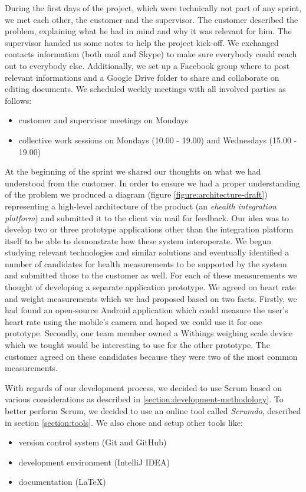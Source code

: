 During the first days of the project, which were technically not part of any sprint,
we met each other, the customer and the supervisor.
The customer described the problem, explaining what he had in mind and why it was relevant for him.
The supervisor handed us some notes to help the project kick-off.
We exchanged contacts information (both mail and Skype) to make sure everybody could reach out to
everybody else. Additionally, we set up a Facebook group where to post relevant informations
and a Google Drive folder to share and collaborate on editing documents.
We scheduled weekly meetings with all involved parties as follows:
\begin{itemize}
\item customer and supervisor meetings on Mondays
\item collective work sessions on Mondays (10.00 - 19.00) and Wednesdays (15.00 - 19.00)
\end{itemize}
At the beginning of the sprint we shared our thoughts on what we had understood from the customer.
In order to ensure we had a proper understanding of the problem we produced a diagram
(figure \ref{figure:architecture-draft}) representing a high-level architecture
of the product (an \textit{ehealth integration platform}) and submitted it to the client via mail for feedback.
Our idea was to develop two or three prototype applications other than the integration
platform itself to be able to demonstrate how these system interoperate.
We begun studying relevant technologies and similar solutions and eventually identified
a number of candidates for health measurements to be supported by the system and
submitted those to the customer as well.
For each of these measurements we thought of developing a separate application prototype.
We agreed on heart rate and weight measurements which we had proposed based on two facts.
Firstly, we had found an open-source Android application which could measure the user's heart rate
using the mobile's camera and hoped we could use it for one prototype.
Secondly, one team member owned a Withings weighing scale device which we tought
would be interesting to use for the other prototype.
The customer agreed on these candidates because they were two of the most common measurements.

With regards of our development process, we decided to use Scrum based on various considerations as
described in \ref{section:development-methodology}. To better perform Scrum, we decided
to use an online tool called \textit{Scrumdo}, described in section \ref{section:tools}.
We also chose and setup other tools like:
\begin{itemize}
\item version control system (Git and GitHub)
\item development environment (IntelliJ IDEA)
\item documentation (LaTeX)
\end{itemize}


